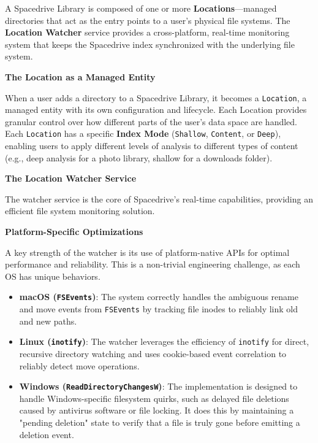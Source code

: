 \documentclass[sigconf]{acmart}
\begin{document}
A Spacedrive Library is composed of one or more \textbf{Locations}---managed directories that act as the entry points to a user's physical file systems. The \textbf{Location Watcher} service provides a cross-platform, real-time monitoring system that keeps the Spacedrive index synchronized with the underlying file system.

\textbf{The Location as a Managed Entity}

When a user adds a directory to a Spacedrive Library, it becomes a \texttt{Location}, a managed entity with its own configuration and lifecycle. Each Location provides granular control over how different parts of the user's data space are handled. Each \texttt{Location} has a specific \textbf{Index Mode} (\texttt{Shallow}, \texttt{Content}, or \texttt{Deep}), enabling users to apply different levels of analysis to different types of content (e.g., deep analysis for a photo library, shallow for a downloads folder).

\textbf{The Location Watcher Service}

The watcher service is the core of Spacedrive's real-time capabilities, providing an efficient file system monitoring solution.

\textbf{Platform-Specific Optimizations}

A key strength of the watcher is its use of platform-native APIs for optimal performance and reliability. This is a non-trivial engineering challenge, as each OS has unique behaviors.

\begin{itemize}[noitemsep, topsep=0pt]
 \item \textbf{macOS (\texttt{FSEvents})}: The system correctly handles the ambiguous rename and move events from \texttt{FSEvents} by tracking file inodes to reliably link old and new paths.

 \item \textbf{Linux (\texttt{inotify})}: The watcher leverages the efficiency of \texttt{inotify} for direct, recursive directory watching and uses cookie-based event correlation to reliably detect move operations.

 \item \textbf{Windows (\texttt{ReadDirectoryChangesW})}: The implementation is designed to handle Windows-specific filesystem quirks, such as delayed file deletions caused by antivirus software or file locking. It does this by maintaining a "pending deletion" state to verify that a file is truly gone before emitting a deletion event.
\end{itemize}
\end{document}
